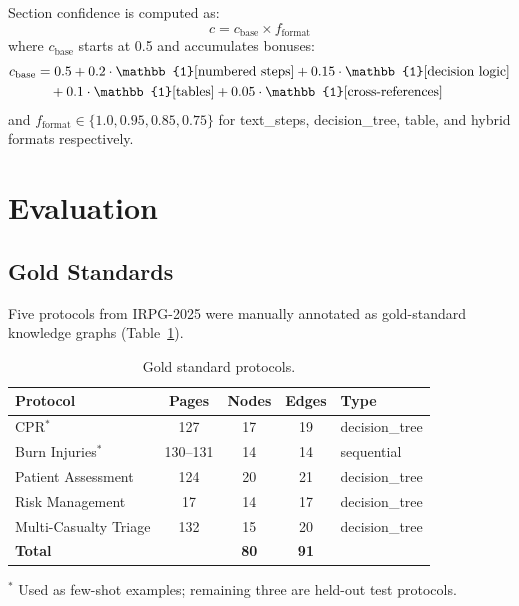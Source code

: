 \documentclass[12pt,a4paper]{article}
\begin{document}
Section confidence is computed as:
\begin{equation}
c = c_{\text{base}} \times f_{\text{format}}
\end{equation}
where $c_{\text{base}}$ starts at 0.5 and accumulates bonuses:
\begin{align}
c_{\text{base}} &= 0.5 + 0.2 \cdot \mathbb{1}[\text{numbered steps}] + 0.15 \cdot \mathbb{1}[\text{decision logic}] \notag \\
&\quad + 0.1 \cdot \mathbb{1}[\text{tables}] + 0.05 \cdot \mathbb{1}[\text{cross-references}]
\end{align}
and $f_{\text{format}} \in \{1.0, 0.95, 0.85, 0.75\}$ for text\_steps, decision\_tree, table, and hybrid formats respectively.

\section{Evaluation}
\label{sec:evaluation}

\subsection{Gold Standards}

Five protocols from IRPG-2025 were manually annotated as gold-standard knowledge graphs (Table~\ref{tab:gold}).

\begin{table}[H]
\centering
\caption{Gold standard protocols.}
\label{tab:gold}
\begin{tabular}{l c c c l}
\toprule
\textbf{Protocol} & \textbf{Pages} & \textbf{Nodes} & \textbf{Edges} & \textbf{Type} \\
\midrule
CPR$^*$                & 127       & 17 & 19 & decision\_tree \\
Burn Injuries$^*$      & 130--131  & 14 & 14 & sequential \\
Patient Assessment     & 124       & 20 & 21 & decision\_tree \\
Risk Management        & 17        & 14 & 17 & decision\_tree \\
Multi-Casualty Triage  & 132       & 15 & 20 & decision\_tree \\
\midrule
\textbf{Total}         &           & \textbf{80} & \textbf{91} & \\
\bottomrule
\end{tabular}

\smallskip
\footnotesize $^*$ Used as few-shot examples; remaining three are held-out test protocols.
\end{table}
\end{document}
